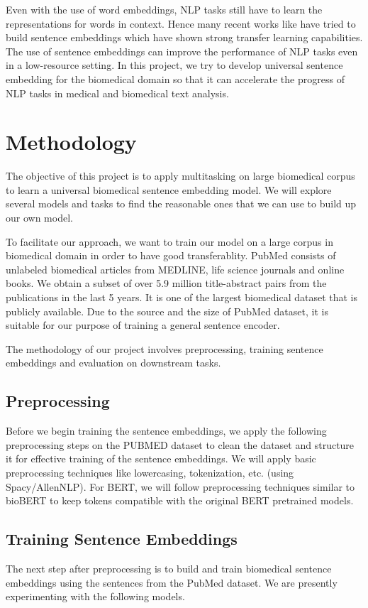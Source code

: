 \documentclass[11pt,a4paper]{article}
\begin{document}
Even with the use of word embeddings, NLP tasks still have to learn the representations for words in context. Hence many recent works like \cite{DBLP:journals/corr/ConneauKSBB17} have tried to build sentence embeddings which have shown strong transfer learning capabilities. The use of sentence embeddings can improve the performance of NLP tasks even in a low-resource setting.
In this project, we try to develop universal sentence embedding for the biomedical domain so that it can accelerate the progress of NLP tasks in medical and biomedical text analysis.
\fi

\section{Methodology}
The objective of this project is to apply multitasking on large biomedical corpus to learn a universal biomedical sentence embedding model. We will explore several models and tasks to find the reasonable ones that we can use to build up our own model. 

To facilitate our approach, we want to train our model on a large corpus in biomedical domain in order to have good transferablity. PubMed consists of unlabeled biomedical articles from MEDLINE, life science journals and online books. We obtain a subset of over 5.9 million title-abstract pairs from the publications in the last 5 years. It is one of the largest biomedical dataset that is publicly available. Due to the source and the size of PubMed dataset, it is suitable for our purpose of training a general sentence encoder.

The methodology of our project involves preprocessing, training sentence embeddings and evaluation on downstream tasks.

\subsection{Preprocessing}
Before we begin training the sentence embeddings, we apply the following preprocessing steps on the PUBMED dataset to clean the dataset and structure it for effective training of the sentence embeddings. We will apply basic preprocessing techniques like lowercasing, tokenization, etc. (using Spacy/AllenNLP). For BERT, we will follow preprocessing techniques similar to bioBERT \cite{lee2019biobert} to keep tokens compatible with the original BERT pretrained models. 

\subsection{Training Sentence Embeddings} 
The next step after preprocessing is to build and train biomedical sentence embeddings using the sentences from the PubMed dataset. We are presently experimenting with the following models.
    
\end{document}

